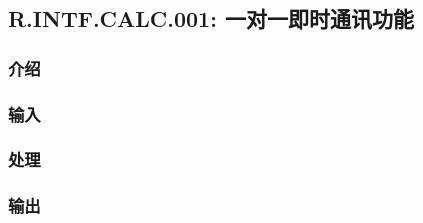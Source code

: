\subsection{R.INTF.CALC.001: 一对一即时通讯功能}
\subsubsection{介绍}
\subsubsection{输入}
\subsubsection{处理}
\subsubsection{输出}
